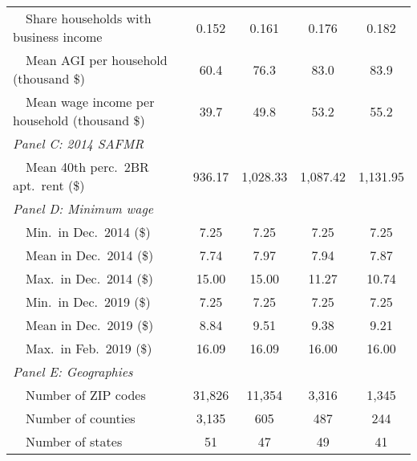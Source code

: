 \begin{landscape}
\begin{table}[hbt!]
\begin{tabular}{@{}lcccc@{}}
        $\quad$Share households with business income         & 0.152    & 0.161   & 0.176   & 0.182          \\
        $\quad$Mean AGI per household (thousand \$)          & 60.4 & 76.3 & 83.0 & 83.9     \\
        $\quad$Mean wage income per household (thousand \$)  & 39.7 & 49.8 & 53.2 & 55.2     \\
        \textit{Panel C: 2014 SAFMR}                         &       &       &        &               \\
        $\quad$Mean 40th perc.\ 2BR apt.\ rent (\$)          & 936.17   & 1,028.33  & 1,087.42  & 1,131.95          \\
        \textit{Panel D: Minimum wage}                       &       &       &        &              \\
        $\quad$Min.\ in Dec.\ 2014 (\$)                      & 7.25   & 7.25  & 7.25  & 7.25         \\
        $\quad$Mean in Dec.\ 2014 (\$)                       & 7.74   & 7.97  & 7.94  & 7.87         \\
        $\quad$Max.\ in Dec.\ 2014 (\$)                      & 15.00   & 15.00  & 11.27  & 10.74         \\
        $\quad$Min.\ in Dec.\ 2019 (\$)                      & 7.25   & 7.25  & 7.25  & 7.25         \\
        $\quad$Mean in Dec.\ 2019 (\$)                       & 8.84   & 9.51  & 9.38  & 9.21         \\
        $\quad$Max.\ in Feb.\ 2019 (\$)                      & 16.09   & 16.09  & 16.00  & 16.00         \\
        \textit{Panel E: Geographies}                        &       &       &        &               \\
        $\quad$Number of ZIP codes                           & 31,826  & 11,354 & 3,316 & 1,345             \\
        $\quad$Number of counties                            & 3,135  & 605 & 487 & 244             \\
        $\quad$Number of states                              & 51  & 47 & 49 & 41             \\ \bottomrule
    \end{tabular}


\end{table}
\end{landscape}
